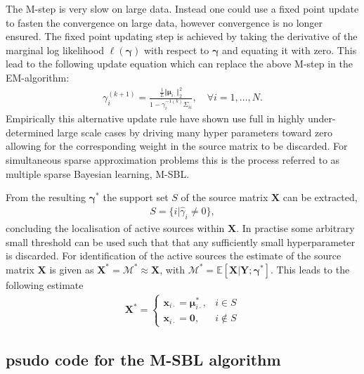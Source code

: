 The M-step is very slow on large data. 
Instead one could use a fixed point update to fasten the convergence on large data, however convergence is no longer ensured. 
The fixed point updating step is achieved by taking the derivative of the marginal log likelihood $\ell(\boldsymbol{\gamma})$ with respect to $\boldsymbol{\gamma}$ and equating it with zero. 
This lead to the following update equation which can replace the above M-step in the EM-algorithm:
\begin{align*}
\gamma_i^{(k+1)} = \frac{\frac{1}{L} \Vert \boldsymbol{\mu}_{i \cdot} \Vert_2^2}{1 - \gamma_i^{-1 (k)} \Sigma_{ii}}, \quad \forall i = 1, \dots, N.
\end{align*}
Empirically this alternative update rule have shown use full in highly under-determined large scale cases by driving many hyper parameters toward zero allowing for the corresponding weight in the source matrix to be discarded. 
For simultaneous sparse approximation problems this is the process referred to as multiple sparse Bayesian learning, M-SBL.

From the resulting $\boldsymbol{\gamma}^\ast$ the support set $S$ of the source matrix $\textbf{X}$ can be extracted, 
\begin{align*}
S = \{ i \vert \hat{\gamma}_i \neq 0 \},
\end{align*}
concluding the localisation of active sources within $\textbf{X}$. 
In practise some arbitrary small threshold can be used such that that any sufficiently small hyperparameter is discarded.
For identification of the active sources the estimate of the source matrix $\textbf{X}$ is given as $\textbf{X}^\ast=\mathcal{M}^\ast \approx \textbf{X}$, with $\mathcal{M}^\ast = \mathbb{E}[\textbf{X}\vert \textbf{Y};\boldsymbol{\gamma}^\ast]$. 
This leads to the following estimate  
\begin{align*}
\mathbf{X}^\ast = 
\begin{cases}
\mathbf{x}_{i\cdot} = \boldsymbol{\mu}_{i \cdot}^\ast, & i \in S \\
\mathbf{x}_{i\cdot} = \mathbf{0}, & i \not \in S
\end{cases}
\end{align*}

\subsection{psudo code for the M-SBL algorithm}

